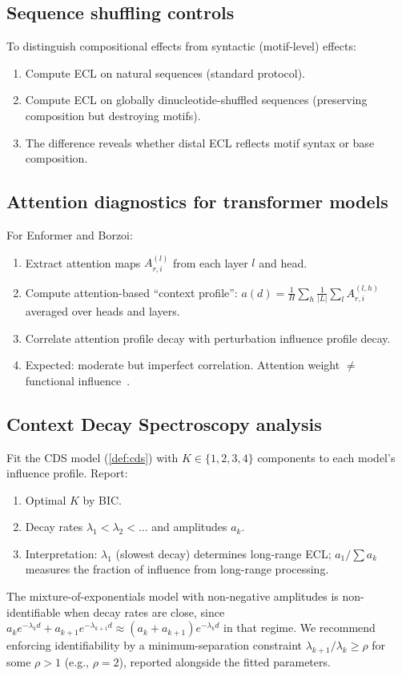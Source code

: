 \subsection{Sequence shuffling controls}

To distinguish compositional effects from syntactic (motif-level) effects:
\begin{enumerate}[leftmargin=2em, label=(\roman*)]
\item Compute ECL on natural sequences (standard protocol).
\item Compute ECL on globally dinucleotide-shuffled sequences (preserving composition but destroying motifs).
\item The difference reveals whether distal ECL reflects motif syntax or base composition.
\end{enumerate}

\subsection{Attention diagnostics for transformer models}

For Enformer and Borzoi:
\begin{enumerate}[leftmargin=2em, label=(\roman*)]
\item Extract attention maps $A^{(l)}_{r,i}$ from each layer $l$ and head.
\item Compute attention-based ``context profile'': $a(d) = \frac{1}{H}\sum_h \frac{1}{|L|}\sum_l A^{(l,h)}_{r,i}$ averaged over heads and layers.
\item Correlate attention profile decay with perturbation influence profile decay.
\item Expected: moderate but imperfect correlation. Attention weight $\neq$ functional influence~\citep{Kendiukhov2026MechInterp}.
\end{enumerate}

\subsection{Context Decay Spectroscopy analysis}

Fit the CDS model (\cref{def:cds}) with $K \in \{1,2,3,4\}$ components to each model's influence profile. Report:
\begin{enumerate}[leftmargin=2em, label=(\roman*)]
\item Optimal $K$ by BIC.
\item Decay rates $\lambda_1 < \lambda_2 < \dots$ and amplitudes $a_k$.
\item Interpretation: $\lambda_1$ (slowest decay) determines long-range ECL; $a_1/\sum a_k$ measures the fraction of influence from long-range processing.
\end{enumerate}
The mixture-of-exponentials model with non-negative amplitudes is non-identifiable when decay rates are close, since $a_k e^{-\lambda_k d} + a_{k+1} e^{-\lambda_{k+1} d} \approx (a_k + a_{k+1}) e^{-\lambda_k d}$ in that regime. We recommend enforcing identifiability by a minimum-separation constraint $\lambda_{k+1}/\lambda_k \ge \rho$ for some $\rho > 1$ (e.g., $\rho = 2$), reported alongside the fitted parameters.

